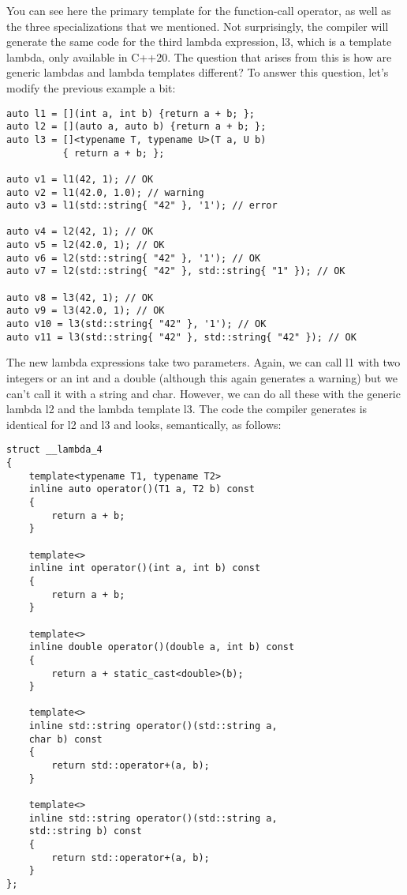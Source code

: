 You can see here the primary template for the function-call operator, as well as the three specializations that we mentioned. Not surprisingly, the compiler will generate the same code for the third lambda expression, l3, which is a template lambda, only available in C++20. The question that arises from this is how are generic lambdas and lambda templates different? To answer this question, let's modify the previous example a bit:

\begin{lstlisting}[style=styleCXX]
auto l1 = [](int a, int b) {return a + b; };
auto l2 = [](auto a, auto b) {return a + b; };
auto l3 = []<typename T, typename U>(T a, U b)
          { return a + b; };
          
auto v1 = l1(42, 1); // OK
auto v2 = l1(42.0, 1.0); // warning
auto v3 = l1(std::string{ "42" }, '1'); // error

auto v4 = l2(42, 1); // OK
auto v5 = l2(42.0, 1); // OK
auto v6 = l2(std::string{ "42" }, '1'); // OK
auto v7 = l2(std::string{ "42" }, std::string{ "1" }); // OK

auto v8 = l3(42, 1); // OK
auto v9 = l3(42.0, 1); // OK
auto v10 = l3(std::string{ "42" }, '1'); // OK
auto v11 = l3(std::string{ "42" }, std::string{ "42" }); // OK
\end{lstlisting}

The new lambda expressions take two parameters. Again, we can call l1 with two integers or an int and a double (although this again generates a warning) but we can't call it with a string and char. However, we can do all these with the generic lambda l2 and the lambda template l3. The code the compiler generates is identical for l2 and l3 and looks, semantically, as follows:

\begin{lstlisting}[style=styleCXX]
struct __lambda_4
{
	template<typename T1, typename T2>
	inline auto operator()(T1 a, T2 b) const
	{
		return a + b;
	}

	template<>
	inline int operator()(int a, int b) const
	{
		return a + b;
	}

	template<>
	inline double operator()(double a, int b) const
	{
		return a + static_cast<double>(b);
	}

	template<>
	inline std::string operator()(std::string a,
	char b) const
	{
		return std::operator+(a, b);
	}

	template<>
	inline std::string operator()(std::string a,
	std::string b) const
	{
		return std::operator+(a, b);
	}
};
\end{lstlisting}

